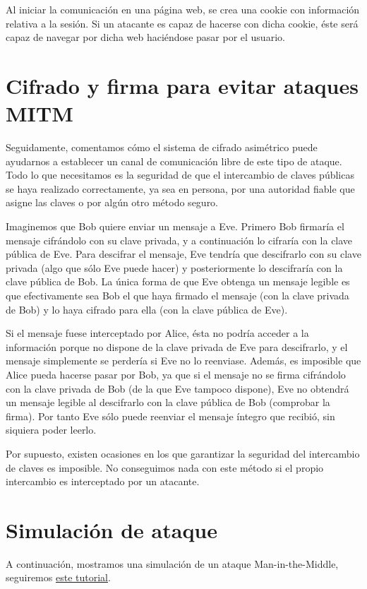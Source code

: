 \documentclass[11pt]{article}
\begin{document}
 Al iniciar la comunicación en una página web, se crea una cookie con información relativa a la sesión. Si un atacante es capaz de hacerse con dicha cookie, éste será capaz de navegar por dicha web haciéndose pasar por el usuario.

\section{Cifrado y firma para evitar ataques MITM}

Seguidamente, comentamos cómo el sistema de cifrado asimétrico puede ayudarnos a establecer un canal de comunicación libre de este tipo de ataque.
Todo lo que necesitamos es la seguridad de que el intercambio de claves públicas se haya realizado correctamente, ya sea en persona, por una
autoridad fiable que asigne las claves o por algún otro método seguro.

Imaginemos que Bob quiere enviar un mensaje a Eve. Primero Bob firmaría el mensaje cifrándolo con su clave privada, y a continuación lo cifraría
con la clave pública de Eve. Para descifrar el mensaje, Eve tendría que descifrarlo con su clave privada (algo que sólo Eve puede hacer) y posteriormente
lo descifraría con la clave pública de Bob. La única forma de que Eve obtenga un mensaje legible es que efectivamente sea Bob el que haya firmado el
 mensaje (con la clave privada de Bob) y lo haya cifrado para ella (con la clave pública de Eve).

Si el mensaje fuese interceptado por Alice, ésta no podría acceder a la información porque no dispone de la clave privada de Eve para descifrarlo,
y el mensaje simplemente se perdería si Eve no lo reenviase.
Además, es imposible que Alice pueda hacerse pasar por Bob, ya que si el mensaje no se firma cifrándolo con la clave privada de Bob (de la que Eve
tampoco dispone), Eve no obtendrá un mensaje legible al descifrarlo con la clave pública de Bob (comprobar la firma). Por tanto Eve sólo puede
reenviar el mensaje íntegro que recibió, sin siquiera poder leerlo.

Por supuesto, existen ocasiones en los que garantizar la seguridad del intercambio de claves es imposible. No conseguimos nada con este método si el
propio intercambio es interceptado por un atacante.

\section{Simulación de ataque}

A continuación, mostramos una simulación de un ataque Man-in-the-Middle, seguiremos
\href{https://www.youtube.com/watch?v=fbXu8EX0hsI}{este tutorial}. 
\end{document}
